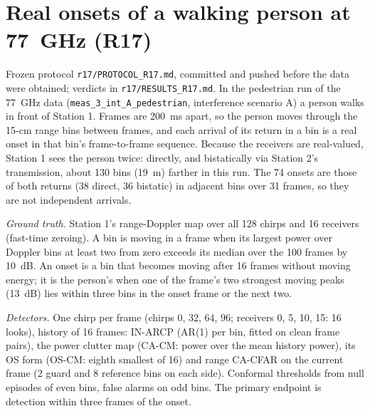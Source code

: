 \section{Real onsets of a walking person at 77~GHz (R17)}\label{sup:r17}
Frozen protocol \texttt{r17/PROTOCOL\_R17.md}, committed and pushed before the data were obtained; verdicts in \texttt{r17/RESULTS\_R17.md}. In the pedestrian run of the 77~GHz data (\texttt{meas\_3\_int\_A\_pedestrian}, interference scenario A) a person walks in front of Station 1. Frames are 200~ms apart, so the person moves through the 15-cm range bins between frames, and each arrival of its return in a bin is a real onset in that bin's frame-to-frame sequence. Because the receivers are real-valued, Station 1 sees the person twice: directly, and bistatically via Station 2's transmission, about 130 bins (19~m) farther in this run. The 74 onsets are those of both returns (38 direct, 36 bistatic) in adjacent bins over 31 frames, so they are not independent arrivals.

\emph{Ground truth.} Station 1's range-Doppler map over all 128 chirps and 16 receivers (fast-time zeroing). A bin is moving in a frame when its largest power over Doppler bins at least two from zero exceeds its median over the 100 frames by 10~dB. An onset is a bin that becomes moving after 16 frames without moving energy; it is the person's when one of the frame's two strongest moving peaks (13~dB) lies within three bins in the onset frame or the next two.

\emph{Detectors.} One chirp per frame (chirps 0, 32, 64, 96; receivers 0, 5, 10, 15: 16 looks), history of 16 frames: IN-ARCP (AR(1) per bin, fitted on clean frame pairs), the power clutter map (CA-CM: power over the mean history power), its OS form (OS-CM: eighth smallest of 16) and range CA-CFAR on the current frame (2 guard and 8 reference bins on each side). Conformal thresholds from null episodes of even bins, false alarms on odd bins. The primary endpoint is detection within three frames of the onset.

